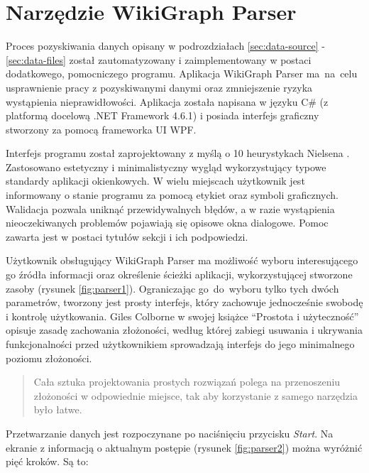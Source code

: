 \section{Narzędzie WikiGraph Parser}
\label{sec:parser-tool}
Proces pozyskiwania danych opisany w podrozdziałach \ref{sec:data-source} - \ref{sec:data-files} został zautomatyzowany i zaimplementowany w postaci dodatkowego, pomocniczego programu. Aplikacja WikiGraph Parser ma~na~celu usprawnienie pracy z pozyskiwanymi danymi oraz zmniejszenie ryzyka wystąpienia nieprawidłowości. Aplikacja została napisana w języku C\# (z platformą docelową .NET Framework 4.6.1) i posiada interfejs graficzny stworzony za pomocą frameworka UI WPF.

Interfejs programu został zaprojektowany z myślą o 10 heurystykach Nielsena \cite{Heuristics}. Zastosowano estetyczny i minimalistyczny wygląd wykorzystujący typowe standardy aplikacji okienkowych. W wielu miejscach użytkownik jest informowany o stanie programu za pomocą etykiet oraz symboli graficznych. Walidacja pozwala uniknąć przewidywalnych błędów, a w razie wystąpienia nieoczekiwanych problemów pojawiają się opisowe okna dialogowe. Pomoc zawarta jest w postaci tytułów sekcji i ich podpowiedzi.


Użytkownik obsługujący WikiGraph Parser ma możliwość wyboru interesującego go źródła informacji oraz określenie ścieżki aplikacji, wykorzystującej stworzone zasoby (rysunek \ref{fig:parser1}). Ograniczając go~do~wyboru tylko tych dwóch parametrów, tworzony jest prosty interfejs, który zachowuje jednocześnie swobodę i kontrolę użytkowania. Giles Colborne w swojej książce ``Prostota i użyteczność'' \cite{ProstotaUzytecznosc} opisuje zasadę zachowania złożoności, według której zabiegi usuwania i ukrywania funkcjonalności przed użytkownikiem sprowadzają interfejs do jego minimalnego poziomu złożoności.

\begin{center}
	\hyphenblockcquote{polish}{ProstotaUzytecznosc}{
        Cała sztuka projektowania prostych rozwiązań polega na przenoszeniu złożoności w odpowiednie miejsce, tak aby korzystanie z samego narzędzia było łatwe.
	}
\end{center}


Przetwarzanie danych jest rozpoczynane po naciśnięciu przycisku \textit{Start}. Na ekranie z informacją o aktualnym postępie (rysunek \ref{fig:parser2}) można wyróżnić pięć kroków. Są to:

